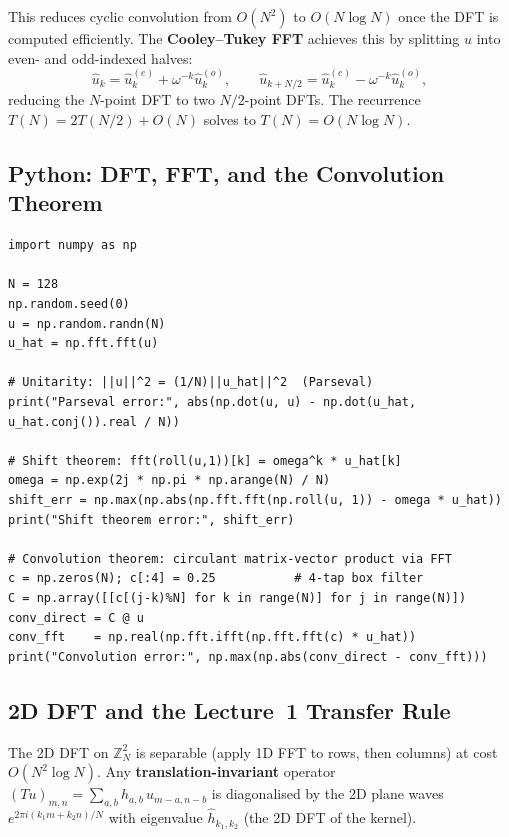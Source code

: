 \documentclass[11pt]{article}
\theoremstyle{definition}
\theoremstyle{plain}
\begin{document}
\noindent
This reduces cyclic convolution from $O(N^2)$ to $O(N\log N)$ once
the DFT is computed efficiently.  The \textbf{Cooley--Tukey FFT}
achieves this by splitting $u$ into even- and odd-indexed halves:
\[
  \hat u_k = \hat u^{(e)}_k + \omega^{-k}\hat u^{(o)}_k, \qquad
  \hat u_{k+N/2} = \hat u^{(e)}_k - \omega^{-k}\hat u^{(o)}_k,
\]
reducing the $N$-point DFT to two $N/2$-point DFTs.  The recurrence
$T(N)=2T(N/2)+O(N)$ solves to $T(N)=O(N\log N)$.

\subsection{Python: DFT, FFT, and the Convolution Theorem}

\begin{lstlisting}
import numpy as np

N = 128
np.random.seed(0)
u = np.random.randn(N)
u_hat = np.fft.fft(u)

# Unitarity: ||u||^2 = (1/N)||u_hat||^2  (Parseval)
print("Parseval error:", abs(np.dot(u, u) - np.dot(u_hat, u_hat.conj()).real / N))

# Shift theorem: fft(roll(u,1))[k] = omega^k * u_hat[k]
omega = np.exp(2j * np.pi * np.arange(N) / N)
shift_err = np.max(np.abs(np.fft.fft(np.roll(u, 1)) - omega * u_hat))
print("Shift theorem error:", shift_err)

# Convolution theorem: circulant matrix-vector product via FFT
c = np.zeros(N); c[:4] = 0.25           # 4-tap box filter
C = np.array([[c[(j-k)%N] for k in range(N)] for j in range(N)])
conv_direct = C @ u
conv_fft    = np.real(np.fft.ifft(np.fft.fft(c) * u_hat))
print("Convolution error:", np.max(np.abs(conv_direct - conv_fft)))
\end{lstlisting}

\subsection{2D DFT and the Lecture~1 Transfer Rule}

\noindent
The 2D DFT on $\mathbb{Z}_N^2$ is separable (apply 1D FFT to rows,
then columns) at cost $O(N^2\log N)$.  Any
\textbf{translation-invariant} operator $(Tu)_{m,n}=\sum_{a,b}h_{a,b}\,u_{m-a,n-b}$
is diagonalised by the 2D plane waves $e^{2\pi i(k_1 m+k_2 n)/N}$
with eigenvalue $\hat h_{k_1,k_2}$ (the 2D DFT of the kernel).
\end{document}
